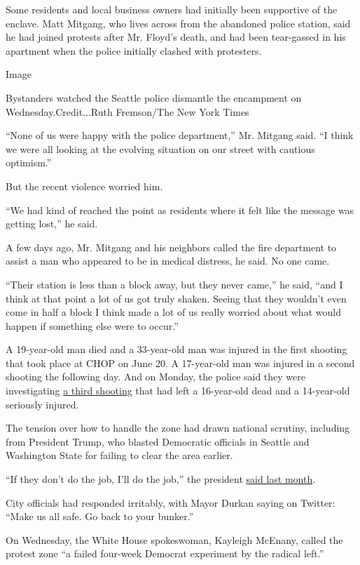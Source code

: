 Some residents and local business owners had initially been supportive
of the enclave. Matt Mitgang, who lives across from the abandoned police
station, said he had joined protests after Mr. Floyd's death, and had
been tear-gassed in his apartment when the police initially clashed with
protesters.

Image

Bystanders watched the Seattle police dismantle the encampment on
Wednesday.Credit...Ruth Fremson/The New York Times

``None of us were happy with the police department,'' Mr. Mitgang said.
``I think we were all looking at the evolving situation on our street
with cautious optimism.''

But the recent violence worried him.

``We had kind of reached the point as residents where it felt like the
message was getting lost,'' he said.

A few days ago, Mr. Mitgang and his neighbors called the fire department
to assist a man who appeared to be in medical distress, he said. No one
came.

``Their station is less than a block away, but they never came,'' he
said, ``and I think at that point a lot of us got truly shaken. Seeing
that they wouldn't even come in half a block I think made a lot of us
really worried about what would happen if something else were to
occur.''

A 19-year-old man died and a 33-year-old man was injured in the first
shooting that took place at CHOP on June 20. A 17-year-old man was
injured in a second shooting the following day. And on Monday, the
police said they were investigating
\href{https://www.nytimes.com/2020/06/29/us/seattle-protests-CHOP-CHAZ-autonomous-zone.html}{a
third shooting} that had left a 16-year-old dead and a 14-year-old
seriously injured.

The tension over how to handle the zone had drawn national scrutiny,
including from President Trump, who blasted Democratic officials in
Seattle and Washington State for failing to clear the area earlier.

``If they don't do the job, I'll do the job,'' the president
\href{https://www.youtube.com/watch?v=tWZkptr0FOI}{said last month}.

City officials had responded irritably, with Mayor Durkan saying on
Twitter: ``Make us all safe. Go back to your bunker.''

On Wednesday, the White House spokeswoman, Kayleigh McEnany, called the
protest zone ``a failed four-week Democrat experiment by the radical
left.''

